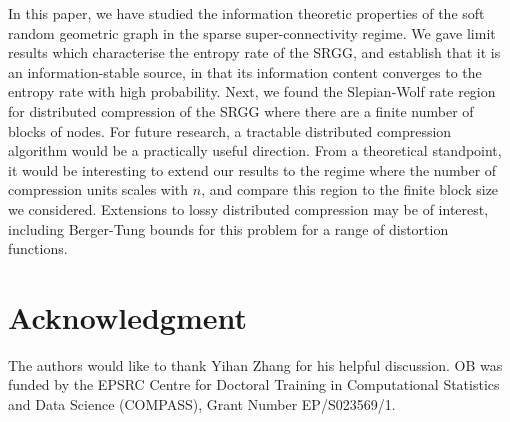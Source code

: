\documentclass[conference,letterpaper]{IEEEtran}
\begin{document}
In this paper, we have studied the information theoretic properties of the soft random geometric graph in the sparse super-connectivity regime. We gave limit results which characterise the entropy rate of the SRGG, and establish that it is an information-stable source, in that its information content converges to the entropy rate with high probability. Next, we found the Slepian-Wolf rate region for distributed compression of the SRGG where there are a finite number of blocks of nodes. For future research, a tractable distributed compression algorithm would be a practically useful direction. From a theoretical standpoint, it would be interesting to extend our results to the regime where the number of compression units scales with $n$, and compare this region to the finite block size we considered. Extensions to lossy distributed compression may be of interest, including Berger-Tung bounds for this problem for a range of distortion functions.


\section*{Acknowledgment}
 The authors would like to thank Yihan Zhang for his helpful discussion. OB was funded by the EPSRC Centre for Doctoral Training in Computational Statistics and Data Science (COMPASS), Grant Number EP/S023569/1.
 


\end{document}
